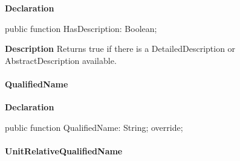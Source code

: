 \documentclass{report}
\newif\ifpdf
\begin{document}
\label{PasDoc_Items.TPasItem-HasDescription}
\begin{list}{}{
\setlength{\itemindent}{0cm}
\setlength{\listparindent}{0cm}
\setlength{\leftmargin}{\evensidemargin}
\addtolength{\leftmargin}{\tmplength}
\settowidth{\labelsep}{X}
\addtolength{\leftmargin}{\labelsep}
\setlength{\labelwidth}{\tmplength}
}
\item[\textbf{Declaration}\hfill]
\ifpdf
\begin{flushleft}
\fi
\begin{ttfamily}
public function HasDescription: Boolean;\end{ttfamily}

\ifpdf
\end{flushleft}
\fi

\par
\item[\textbf{Description}]
Returns true if there is a DetailedDescription or AbstractDescription available.

\end{list}
\paragraph*{QualifiedName}\hspace*{\fill}

\label{PasDoc_Items.TPasItem-QualifiedName}
\begin{list}{}{
\setlength{\itemindent}{0cm}
\setlength{\listparindent}{0cm}
\setlength{\leftmargin}{\evensidemargin}
\addtolength{\leftmargin}{\tmplength}
\settowidth{\labelsep}{X}
\addtolength{\leftmargin}{\labelsep}
\setlength{\labelwidth}{\tmplength}
}
\item[\textbf{Declaration}\hfill]
\ifpdf
\begin{flushleft}
\fi
\begin{ttfamily}
public function QualifiedName: String; override;\end{ttfamily}

\ifpdf
\end{flushleft}
\fi

\end{list}
\paragraph*{UnitRelativeQualifiedName}\hspace*{\fill}
\end{document}
